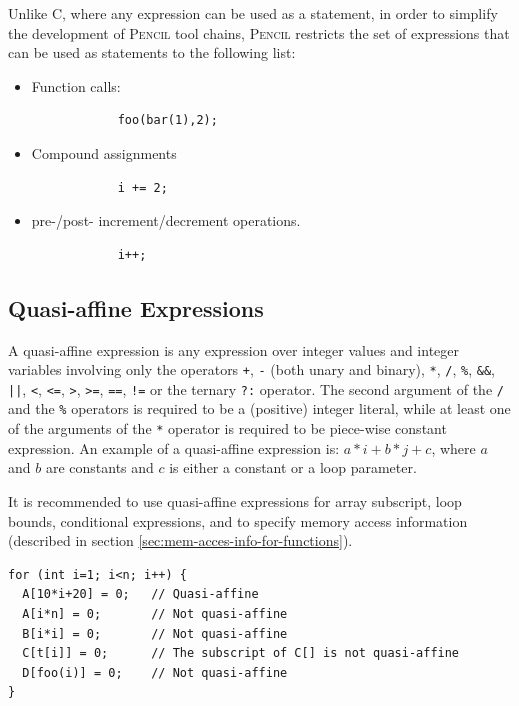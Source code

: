 \documentclass{carp}
\newcommand\pencil{\textsc{Pencil}\xspace}
\begin{document}
Unlike C, where any expression can be used as a statement, in
order to simplify the development of \pencil tool chains, \pencil
restricts the set of expressions that can be used as statements
to the following list:
\begin{itemize}
    \item Function calls:
        \begin{lstlisting}
            foo(bar(1),2);
        \end{lstlisting}
    \item Compound assignments
        \begin{lstlisting}
            i += 2;
        \end{lstlisting}
    \item pre-/post- increment/decrement operations.
        \begin{lstlisting}
            i++;
        \end{lstlisting}
\end{itemize}


\subsection{Quasi-affine Expressions}
\label{sec:quasi-affine}

A quasi-affine expression is any expression over integer values and
integer variables involving only the operators \lstinline{+},
\lstinline{-} (both unary and binary), \lstinline{*}, \lstinline{/},
\lstinline{%}, \lstinline{&&}, \lstinline{||}, \lstinline{<}, \lstinline{<=},
\lstinline{>}, \lstinline{>=}, \lstinline{==}, \lstinline{!=} or the
ternary \lstinline{?:} operator.  The second argument of the
\lstinline{/} and the \lstinline{%}
operators is required to be a (positive) integer literal, while at
least one of the arguments of the \lstinline{*} operator is
required to be piece-wise constant expression. An example of a
quasi-affine expression is: $a*i+b*j+c$, where $a$ and $b$ are
constants and $c$ is either a constant or a loop parameter.

It is recommended to use quasi-affine expressions for
array subscript, loop bounds, conditional expressions,
and to specify memory access information (described in
section \ref{sec:mem-acces-info-for-functions}).

\begin{lstlisting}[language=pencil]
for (int i=1; i<n; i++) {
  A[10*i+20] = 0;	// Quasi-affine
  A[i*n] = 0;		// Not quasi-affine
  B[i*i] = 0;		// Not quasi-affine
  C[t[i]] = 0;		// The subscript of C[] is not quasi-affine
  D[foo(i)] = 0;	// Not quasi-affine
}
\end{lstlisting}
\end{document}
